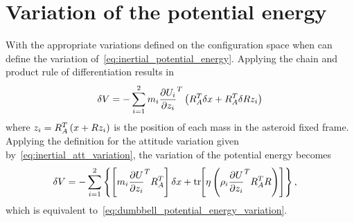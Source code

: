 \section{Variation of the potential energy}\label{sec:inertial_potential_energy_variation}
With the appropriate variations defined on the configuration space when can define the variation of~\cref{eq:inertial_potential_energy}.
Applying the chain and product rule of differentiation results in
\begin{align}
    \delta V = - \sum_{i=1}^{2} m_i \frac{\partial U_i}{\partial z_i}^T \left(  R_A^T \delta x + R_A^T \delta R z_i \right)
\end{align}
where \( z_i = R_A^T \left( x + R z_i \right) \) is the position of each mass in the asteroid fixed frame.
Applying the definition for the attitude variation given by~\cref{eq:inertial_att_variation}, the variation of the potential energy becomes
\begin{align*}
    \delta V &= - \sum_{i=1}^2 \left\{  \left[ m_i \frac{\partial U}{\partial z_i}^T R_A^T  \right] \delta x + \mathrm{tr}\negthickspace\left[  \eta \left(  \rho_i \frac{\partial U}{\partial z_i}^T R_A^T R  \right)  \right] \right\},
\end{align*}
which is equivalent to~\cref{eq:dumbbell_potential_energy_variation}.

